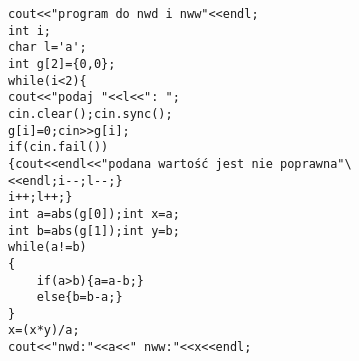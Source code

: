 \begin{verbatim}
cout<<"program do nwd i nww"<<endl;  
int i;
char l='a';
int g[2]={0,0};      
while(i<2){
cout<<"podaj "<<l<<": ";
cin.clear();cin.sync();
g[i]=0;cin>>g[i];
if(cin.fail())
{cout<<endl<<"podana wartość jest nie poprawna"\
<<endl;i--;l--;}
i++;l++;}	
int a=abs(g[0]);int x=a;
int b=abs(g[1]);int y=b;     
while(a!=b)
{
	if(a>b){a=a-b;}
	else{b=b-a;}
}
x=(x*y)/a;
cout<<"nwd:"<<a<<" nww:"<<x<<endl;
\end{verbatim}